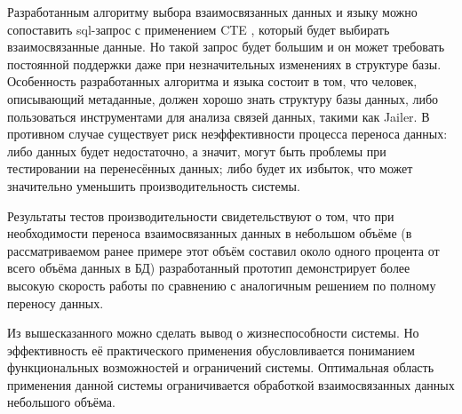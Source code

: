 Разработанным алгоритму выбора взаимосвязанных данных и языку можно сопоставить sql-запрос с применением CTE \cite{pg-cte}, который будет выбирать взаимосвязанные данные. Но такой запрос будет большим и он может требовать постоянной поддержки даже при незначительных изменениях в структуре базы. Особенность разработанных алгоритма и языка состоит в том, что человек, описывающий метаданные, должен хорошо знать структуру базы данных, либо пользоваться инструментами для анализа связей данных, такими как Jailer. В противном случае существует риск неэффективности процесса переноса данных: либо данных будет недостаточно, а значит, могут быть проблемы при тестировании на перенесённых данных; либо будет их избыток, что может значительно уменьшить производительность системы.

Результаты тестов производительности свидетельствуют о том, что при необходимости переноса взаимосвязанных данных в небольшом объёме (в рассматриваемом ранее примере этот объём составил около одного процента от всего объёма данных в БД) разработанный прототип демонстрирует более высокую скорость работы по сравнению с аналогичным решением по полному переносу данных.

Из вышесказанного можно сделать вывод о жизнеспособности системы. Но эффективность её практического применения обусловливается пониманием функциональных возможностей и ограничений системы. Оптимальная область применения данной системы ограничивается обработкой взаимосвязанных данных небольшого объёма.
